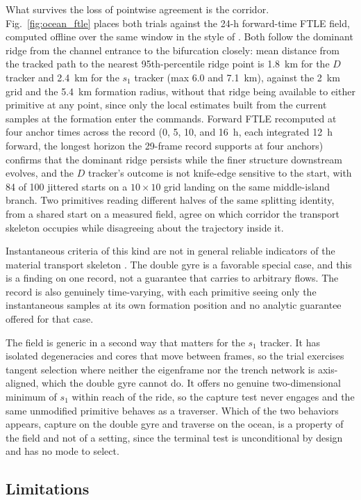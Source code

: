 \documentclass[lettersize,journal]{IEEEtran}
\begin{document}
What survives the loss of pointwise agreement is the corridor.
Fig.~\ref{fig:ocean_ftle} places both trials against the 24-h forward-time
FTLE field, computed offline over the same window in the style of
\cite{11}. Both follow the dominant ridge from the channel entrance to the
bifurcation closely: mean distance from the tracked path to the nearest
95th-percentile ridge point is 1.8~km for the $D$ tracker and 2.4~km for
the $s_1$ tracker (max 6.0 and 7.1~km), against the 2~km grid and the
5.4~km formation radius, without that ridge being available to either
primitive at any point, since only the local estimates built from the
current samples at the formation enter the commands. Forward FTLE
recomputed at four anchor times across the record (0, 5, 10, and 16~h,
each integrated 12~h forward, the longest horizon the 29-frame record
supports at four anchors) confirms that the dominant ridge
persists while the finer structure downstream evolves, and the $D$
tracker's outcome is not knife-edge sensitive to the start, with 84 of 100
jittered starts on a $10 \times 10$ grid landing on the same
middle-island branch. Two primitives reading different halves of the
same splitting identity, from a shared start on a measured field, agree
on which corridor the transport skeleton occupies while disagreeing
about the trajectory inside it.

Instantaneous criteria of this kind are not in general reliable indicators
of the material transport skeleton \cite{16}. The double gyre is a
favorable special case, and this is a finding on one record, not a
guarantee that carries to arbitrary flows. The record is also genuinely
time-varying, with each primitive seeing only the instantaneous samples at
its own formation position and no analytic guarantee offered for that case.

The field is generic in a second way that matters for the $s_1$ tracker. It
has isolated degeneracies and cores that move between frames, so the
trial exercises tangent selection where
neither the eigenframe nor the trench network is axis-aligned, which the
double gyre cannot do. It offers no genuine two-dimensional minimum of
$s_1$ within reach of the ride, so the capture test never engages and
the same unmodified primitive behaves as a traverser. Which of the two behaviors
appears, capture on the double gyre and traverse on the ocean, is a
property of the field and not of a setting, since the terminal test is
unconditional by design and has no mode to select.

\subsection{Limitations}
\end{document}
